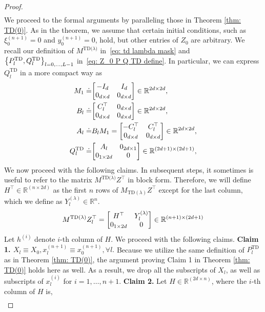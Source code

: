 \documentclass{article}
\newcommand{\R}{\mathbb{R}}
\newcommand{\paren}[1]{{\left(#1\right)}}
\newcommand{\td}{\text{TD}}
\newcommand{\tdlambda}{\text{TD($\lambda$)}}
\begin{document}
\begin{proof}
\begin{align}
    \end{align}
    We proceed to the formal arguments by paralleling those in Theorem \ref{thm: TD(0)}. As in the theorem, we assume that certain initial conditions, such as $\xi_0^{(n+1)} = 0$ and $y_0^{(n+1)} = 0$, hold, but other entries of $Z_0$ are arbitrary.
    We recall our definition of $M^\tdlambda$ in~\eqref{eq: td lambda mask} and $\qty{P_l^{\td}, Q_l^{\td}}_{l=0,\dots,L-1}$ in~\eqref{eq: Z_0 P Q TD define}.
    In particular,
    we can express $Q_l^{\td}$ in a more compact way as
    \begin{align}
      M_1 \doteq& \mqty[-I_{d} & I_{d} \\0_{d \times d} & 0_{d \times d}] \in \R^{2d \times 2d}, \label{eq: lambda M_1 define}\\
      B_l \doteq& \mqty[C_l^\top & 0_{d\times d} \\ 0_{d \times d} & 0_{d \times d}] \in \R^{2d \times 2d},\\
      A_l \doteq& B_l M_1  = \mqty[-C_l^\top & C_l^\top \\ 0_{d \times d} & 0_{d \times d}] \in \R^{2d \times 2d},\\
      Q_l^{\td} \doteq& \mqty[A_l & 0_{2d \times 1} \\ 0_{1 \times 2d} & 0] \in \R^{(2d + 1) \times (2d+1)},
    \end{align}
We now proceed with the following claims.
    In subsequent steps, it sometimes is useful to refer to the matrix $M^\tdlambda Z^{\top}$ in block form. Therefore, we will define $H^\top \in \R^{\paren{n \times 2d}}$ as the first $n$ rows of $M_{\td(\lambda)}Z^\top$ except for the last column, which we define as $Y_l^{(\lambda)} \in \R^n$.
    \begin{align}
        M^\tdlambda Z_l^{\top} = \mqty[H^\top & Y_l^{(\lambda)} \\ 0_{1\times 2d} & 0] \in \R^{(n+1) \times (2d+1)} \label{eq: M lambda ZT}
    \end{align}
    Let $h^{(i)}$ denote $i$-th column of $H$.
We proceed with the following claims.
\textbf{Claim 1. $X_l \equiv X_0 , x_l^{(n+1)} \equiv x_0^{(n+1)}, \forall l.$}
    Because we utilize the same definition of $P_l^{\td}$ as in Theorem \ref{thm: TD(0)}, the argument proving Claim 1 in Theorem \ref{thm: TD(0)} holds here as well. As a result,
    we drop all the subscripts of $X_l$,
    as well as subscripts of $x_l^{(i)}$ for $i=1,\dots, n+1$.
\textbf{Claim 2.}  Let $H \in \R^{\paren{2d \times n}}$, where the $i$-th column of $H$ is,
    \begin{align}

\end{align}
\end{proof}
\end{document}
